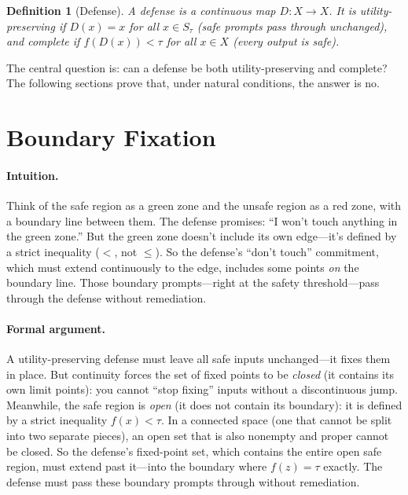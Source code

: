 \documentclass[11pt]{article}
\newtheorem{definition}[theorem]{Definition}
\begin{document}
\begin{definition}[Defense]
\label{def:defense}
A \emph{defense} is a continuous map $D\colon X \to X$. It is
\emph{utility-preserving} if $D(x) = x$ for all $x \in S_\tau$
(safe prompts pass through unchanged),
and \emph{complete} if $f(D(x)) < \tau$ for all $x\in X$
(every output is safe).
\end{definition}

The central question is: can a defense be both utility-preserving and
complete? The following sections prove that, under natural conditions,
the answer is no.


\section{Boundary Fixation}
\label{sec:boundary}

\paragraph{Intuition.}
Think of the safe region as a green zone and the unsafe region as a
red zone, with a boundary line between them. The defense promises:
``I won't touch anything in the green zone.'' But the green zone
doesn't include its own edge---it's defined by a strict inequality
($<$, not $\leq$). So the defense's ``don't touch'' commitment, which
must extend continuously to the edge, includes some points
\emph{on} the boundary line. Those boundary prompts---right at the
safety threshold---pass through the defense without remediation.

\paragraph{Formal argument.}
A utility-preserving defense must leave all safe inputs unchanged---it
fixes them in place. But continuity forces the set of fixed points to
be \emph{closed} (it contains its own limit points): you cannot ``stop
fixing'' inputs without a discontinuous jump. Meanwhile, the safe
region is \emph{open} (it does not contain its boundary): it is
defined by a strict inequality $f(x) < \tau$. In a connected space
(one that cannot be split into two separate pieces), an
open set that is also nonempty and proper cannot be closed. So the
defense's fixed-point set, which contains the entire open safe region,
must extend past it---into the boundary where $f(z) = \tau$ exactly.
The defense must pass these boundary prompts through without
remediation.
\end{document}
